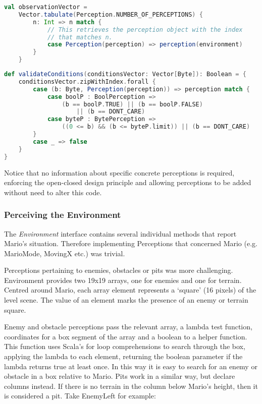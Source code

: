 \begin{minipage}{0.9\linewidth}
\centering
\begin{lstlisting}[language=scala]
val observationVector = 
    Vector.tabulate(Perception.NUMBER_OF_PERCEPTIONS) {
        n: Int => n match {
            // This retrieves the perception object with the index
            // that matches n. 
            case Perception(perception) => perception(environment)
        }
    }
\end{lstlisting}
\end{minipage}

\begin{minipage}{0.9\linewidth}
\centering
\begin{lstlisting}[language=scala]
def validateConditions(conditionsVector: Vector[Byte]): Boolean = {
    conditionsVector.zipWithIndex.forall {
        case (b: Byte, Perception(perception)) => perception match {
            case boolP : BoolPerception => 
                (b == boolP.TRUE) || (b == boolP.FALSE) 
                    || (b == DONT_CARE)
            case byteP : BytePerception => 
                ((0 <= b) && (b <= byteP.limit)) || (b == DONT_CARE)
        }
        case _ => false 
    }
}

\end{lstlisting}
\end{minipage}

Notice that no information about specific concrete perceptions is required, enforcing the open-closed design principle and allowing perceptions to be added without need to alter this code.

\subsubsection{Perceiving the Environment}

The \emph{Environment} interface contains several individual methods that report Mario's situation. Therefore implementing Perceptions that concerned Mario (e.g. MarioMode, MovingX etc.) was trivial.

Perceptions pertaining to enemies, obstacles or pits was more challenging. Environment provides two 19x19 arrays, one for enemies and one for terrain. Centred around Mario, each array element represents a `square' (16 pixels) of the level scene. The value of an element marks the presence of an enemy or terrain square. 

Enemy and obstacle perceptions pass the relevant array, a lambda test function, coordinates for a box segment of the array and a boolean to a helper function. This function uses Scala's for loop comprehensions to search through the box, applying the lambda to each element, returning the boolean parameter if the lambda returns true at least once. In this way it is easy to search for an enemy or obstacle in a box relative to Mario. Pits work in a similar way, but declare columns instead. If there is no terrain in the column below Mario's height, then it is considered a pit. Take EnemyLeft for example:

